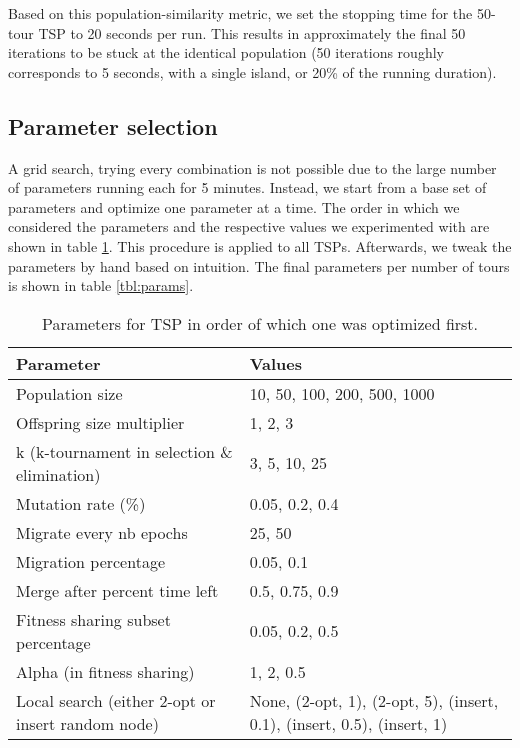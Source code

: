 \documentclass[a4paper,10pt]{article}
\newcommand{\ReplaceMe}[1]{{\color{blue}#1}}
\begin{document}
Based on this population-similarity metric, we set the stopping time for the 50-tour TSP to 20 seconds per run. This results in approximately the final 50 iterations to be stuck at the identical population (50 iterations roughly corresponds to 5 seconds, with a single island, or 20\% of the running duration).



\subsection{Parameter selection}
	A grid search, trying every combination is not possible due to the large number of parameters running each for 5 minutes. Instead, we start from a base set of parameters and optimize one parameter at a time. The order in which we considered the parameters and the respective values we experimented with are shown in table \ref{tbl:order-of-params}. This procedure is applied to all TSPs. Afterwards, we tweak the parameters by hand based on intuition. The final parameters per number of tours is shown in table \ref{tbl:params}.

	\begin{table}[ht]
		\centering
		\begin{tabularx}{0.9\textwidth}{|X|X|}
			\hline
			\textbf{Parameter} & \textbf{Values} \\
			\hline
			Population size & 10, 50, 100, 200, 500, 1000 \\
			\hline
			Offspring size multiplier & 1, 2, 3 \\
			\hline
			k (k-tournament in selection \& elimination) & 3, 5, 10, 25 \\
			\hline
			Mutation rate (\%) & 0.05, 0.2, 0.4 \\
			\hline
			Migrate every nb epochs & 25, 50 \\
			\hline
			Migration percentage & 0.05, 0.1 \\
			\hline
			Merge after percent time left & 0.5, 0.75, 0.9 \\
			\hline
			Fitness sharing subset percentage & 0.05, 0.2, 0.5 \\
			\hline
			Alpha (in fitness sharing) & 1, 2, 0.5 \\
			\hline
			Local search (either 2-opt or insert random node) & None, (2-opt, 1), (2-opt, 5), (insert, 0.1), (insert, 0.5), (insert, 1) \\
			\hline
		\end{tabularx}
		\caption{Parameters for TSP in order of which one was optimized first.}
		\label{tbl:order-of-params}
	\end{table}
\end{document}
